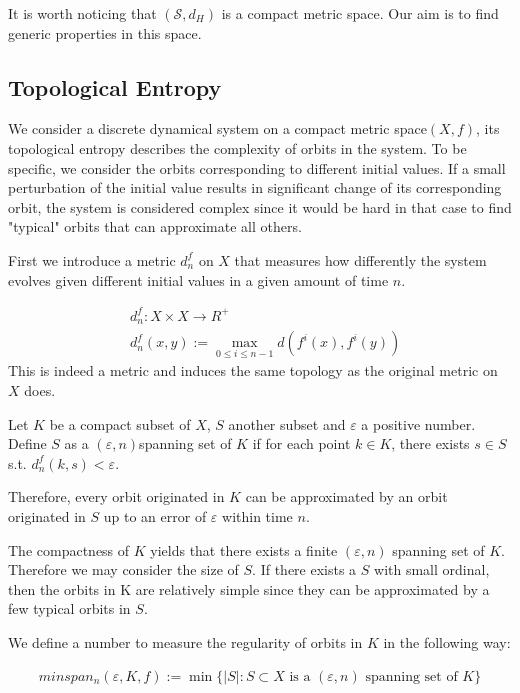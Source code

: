 \documentclass{article}
\begin{document}
\begin{CJK}{UTF8}{gbsn}
It is worth noticing that  $(\mathcal{S},d_H)$ is a compact metric space. Our aim is to find generic properties in this space.

\subsection{Topological Entropy}
We consider a discrete dynamical system on a compact metric space$(X,f)$, its topological entropy describes the complexity of orbits in the system. To be specific, we consider the orbits corresponding to different initial values. If a small perturbation of the initial value results in significant change of its corresponding orbit, the system is considered complex since it would be hard in that case to find "typical" orbits that can approximate all others.


First we introduce a metric $d_n^f$ on $X$ that measures how differently the system evolves given different initial values in a given amount of time $n$.


\begin{align*}
    &d_n^f:X\times X\rightarrow R^+ \\
	&d_n^f(x,y):=\max_{0\leq i\leq n-1}d(f^i(x),f^i(y))
\end{align*}
This is indeed a metric and induces the same topology as the original metric on $X$ does.

\vspace{3ex}

Let $K$ be a compact subset of $X$, $S$ another subset and $\varepsilon$ a positive number. Define $S$ as a $(\varepsilon,n)$spanning set of $K$ if for each point $k\in K$, there exists $s\in S$ s.t. $d_n^f(k,s)<\varepsilon$.

Therefore, every orbit originated in $K$ can be approximated by an orbit originated in $S$ up to an error of $\varepsilon$ within time $n$.

The compactness of $K$ yields that there exists a finite $(\varepsilon,n)$ spanning set of $K$. Therefore we may consider the size of $S$. If there exists a $S$ with small ordinal, then the orbits in K are relatively simple since they can be approximated by a few typical orbits in $S$.

We define a number to measure the regularity of orbits in $K$ in the following way:

\begin{align*}
	minspan_n(\varepsilon,K,f):=\min\{|S|:S\subset X\mbox{ is a }(\varepsilon,n) \mbox{ spanning set of }  K\}
\end{align*}
	

\end{CJK}
\end{document}
